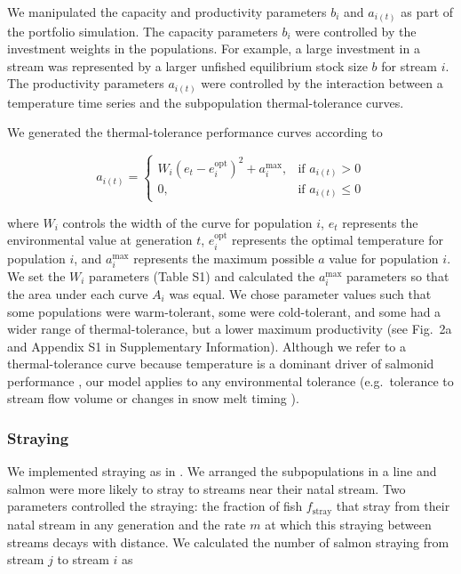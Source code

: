 We manipulated the capacity and productivity parameters $b_i$ and $a_{i(t)}$ as part of the portfolio simulation. The capacity parameters $b_i$ were controlled by the investment weights in the populations. For example, a large investment in a stream was represented by a larger unfished equilibrium stock size $b$ for stream $i$. The productivity parameters $a_{i(t)}$ were controlled by the interaction between a temperature time series and the subpopulation thermal-tolerance curves.

We generated the thermal-tolerance performance curves according to

\[a_{i(t)} =
  \begin{cases}
    W_i (e_t - e_i^{\mathrm{opt}})^2 + a_i^{\mathrm{max}},
      & \text{if } a_{i(t)} > 0\\
      0, & \text{if } a_{i(t)} \leq 0
  \end{cases}\]

\noindent where $W_i$ controls the width of the curve for population $i$, $e_t$ represents the environmental value at generation $t$, $e_i^{\mathrm{opt}}$ represents the optimal temperature for population $i$, and $a_i^{\mathrm{max}}$ represents the maximum possible $a$ value for population $i$. We set the $W_i$ parameters (Table S1) and calculated the $a_i^{\mathrm{max}}$ parameters so that the area under each curve $A_i$ was equal. We chose parameter values such that some populations were warm-tolerant, some were cold-tolerant, and some had a wider range of thermal-tolerance, but a lower maximum productivity (see Fig.~2a and Appendix S1 in Supplementary Information). Although we refer to a thermal-tolerance curve because temperature is a dominant driver of salmonid performance \citep{mccullough1999}, our model applies to any environmental tolerance (e.g.~tolerance to stream flow volume or changes in snow melt timing \citep{crozier2008}).

\subsubsection{Straying}

We implemented straying as in \citet{cooper1999}. We arranged the subpopulations in a line and salmon were more likely to stray to streams near their natal stream. Two parameters controlled the straying: the fraction of fish $f_{\mathrm{stray}}$ that stray from their natal stream in any generation and the rate $m$ at which this straying between streams decays with distance. We calculated the number of salmon straying from stream $j$ to stream $i$ as

